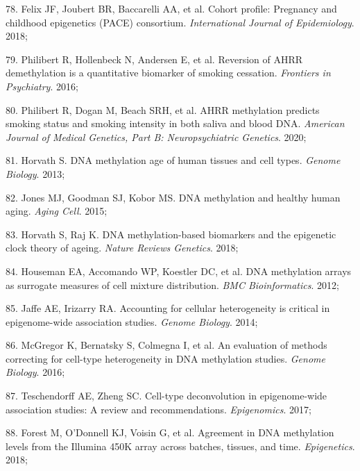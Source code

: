 \documentclass[11pt,oneside]{bristolthesis}
\newenvironment{cslreferences}%
  {}%
  {\par}
\begin{document}
\begin{cslreferences}
\leavevmode\hypertarget{ref-Felix2018}{}%
78. Felix JF, Joubert BR, Baccarelli AA, et al. Cohort profile: Pregnancy and childhood epigenetics (PACE) consortium. \emph{International Journal of Epidemiology}. 2018;

\leavevmode\hypertarget{ref-Philibert2016}{}%
79. Philibert R, Hollenbeck N, Andersen E, et al. Reversion of AHRR demethylation is a quantitative biomarker of smoking cessation. \emph{Frontiers in Psychiatry}. 2016;

\leavevmode\hypertarget{ref-Philibert2020}{}%
80. Philibert R, Dogan M, Beach SRH, et al. AHRR methylation predicts smoking status and smoking intensity in both saliva and blood DNA. \emph{American Journal of Medical Genetics, Part B: Neuropsychiatric Genetics}. 2020;

\leavevmode\hypertarget{ref-Horvath2013}{}%
81. Horvath S. DNA methylation age of human tissues and cell types. \emph{Genome Biology}. 2013;

\leavevmode\hypertarget{ref-Jones2015}{}%
82. Jones MJ, Goodman SJ, Kobor MS. DNA methylation and healthy human aging. \emph{Aging Cell}. 2015;

\leavevmode\hypertarget{ref-Horvath2018}{}%
83. Horvath S, Raj K. DNA methylation-based biomarkers and the epigenetic clock theory of ageing. \emph{Nature Reviews Genetics}. 2018;

\leavevmode\hypertarget{ref-Houseman2012}{}%
84. Houseman EA, Accomando WP, Koestler DC, et al. DNA methylation arrays as surrogate measures of cell mixture distribution. \emph{BMC Bioinformatics}. 2012;

\leavevmode\hypertarget{ref-Jaffe2014}{}%
85. Jaffe AE, Irizarry RA. Accounting for cellular heterogeneity is critical in epigenome-wide association studies. \emph{Genome Biology}. 2014;

\leavevmode\hypertarget{ref-McGregor2016}{}%
86. McGregor K, Bernatsky S, Colmegna I, et al. An evaluation of methods correcting for cell-type heterogeneity in DNA methylation studies. \emph{Genome Biology}. 2016;

\leavevmode\hypertarget{ref-Teschendorff2017}{}%
87. Teschendorff AE, Zheng SC. Cell-type deconvolution in epigenome-wide association studies: A review and recommendations. \emph{Epigenomics}. 2017;

\leavevmode\hypertarget{ref-Forest2018}{}%
88. Forest M, O'Donnell KJ, Voisin G, et al. Agreement in DNA methylation levels from the Illumina 450K array across batches, tissues, and time. \emph{Epigenetics}. 2018;


\end{cslreferences}
\end{document}
